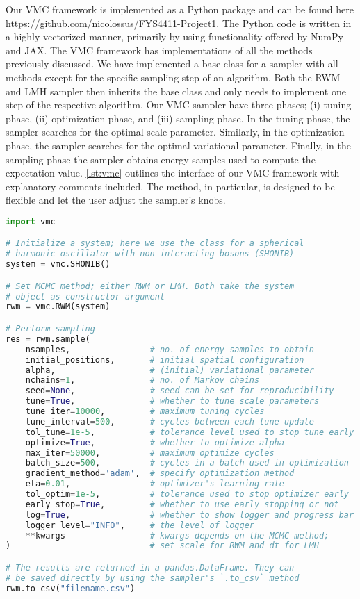 Our VMC framework is implemented as a Python package and can be found here \url{https://github.com/nicolossus/FYS4411-Project1}. The Python code is written in a highly vectorized manner, primarily by using functionality offered by NumPy \citep{numpy} and JAX. The VMC framework has implementations of all the methods previously discussed. We have implemented a base class for a sampler with all methods except for the specific sampling step of an algorithm. Both the RWM and LMH sampler then inherits the base class and only needs to implement one step of the respective algorithm. Our VMC sampler have three phases; (i) tuning phase, (ii) optimization phase, and (iii) sampling phase. In the tuning phase, the sampler searches for the optimal scale parameter. Similarly, in the optimization phase, the sampler searches for the optimal variational parameter. Finally, in the sampling phase the sampler obtains energy samples used to compute the expectation value. \cref{lst:vmc} outlines the interface of our VMC framework with explanatory comments included. The  method, in particular, is designed to be flexible and let the user adjust the sampler's knobs. 

\newpage
\begin{lstlisting}[language=python, label={lst:vmc}, caption={Example usage of the VMC framework.}]
import vmc

# Initialize a system; here we use the class for a spherical
# harmonic oscillator with non-interacting bosons (SHONIB)
system = vmc.SHONIB()

# Set MCMC method; either RWM or LMH. Both take the system
# object as constructor argument
rwm = vmc.RWM(system)

# Perform sampling
res = rwm.sample(
    nsamples,                # no. of energy samples to obtain
    initial_positions,       # initial spatial configuration
    alpha,                   # (initial) variational parameter
    nchains=1,               # no. of Markov chains
    seed=None,               # seed can be set for reproducibility
    tune=True,               # whether to tune scale parameters
    tune_iter=10000,         # maximum tuning cycles
    tune_interval=500,       # cycles between each tune update
    tol_tune=1e-5,           # tolerance level used to stop tune early
    optimize=True,           # whether to optimize alpha
    max_iter=50000,          # maximum optimize cycles
    batch_size=500,          # cycles in a batch used in optimization
    gradient_method='adam',  # specify optimization method
    eta=0.01,                # optimizer's learning rate
    tol_optim=1e-5,          # tolerance used to stop optimizer early
    early_stop=True,         # whether to use early stopping or not
    log=True,                # whether to show logger and progress bar
    logger_level="INFO",     # the level of logger
    **kwargs                 # kwargs depends on the MCMC method;
)                            # set scale for RWM and dt for LMH

# The results are returned in a pandas.DataFrame. They can
# be saved directly by using the sampler's `.to_csv` method
rwm.to_csv("filename.csv")

\end{lstlisting}

